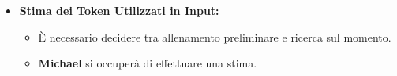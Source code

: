 \begin{itemize}
    \item \textbf{Stima dei Token Utilizzati in Input:}
    \begin{itemize}
        \renewcommand{\labelitemii}{--}
        \item È necessario decidere tra allenamento preliminare e ricerca sul momento.
        \item \textbf{Michael} si occuperà di effettuare una stima.
    \end{itemize}
\end{itemize}